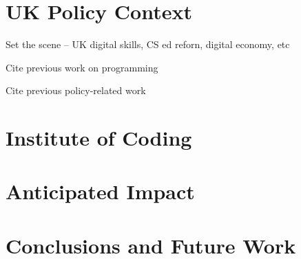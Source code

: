 \documentclass[sigconf]{acmart}
\begin{document}
\section{UK Policy Context}
Set the scene -- UK digital skills, CS ed reforn, digital economy, etc

Cite previous work on programming~\cite{davenport-et-al:latice2016,murphy-et-al:programming2017,simon-et-al:sigcse2018}

Cite previous policy-related work~\cite{crick+sentance:2011,brown-et-al-sigcse2013,brown-et-al-toce2014,crick+moller-wipsce2015}

\section{Institute of Coding}

\section{Anticipated Impact}

\section{Conclusions and Future Work}




 
\end{document}
